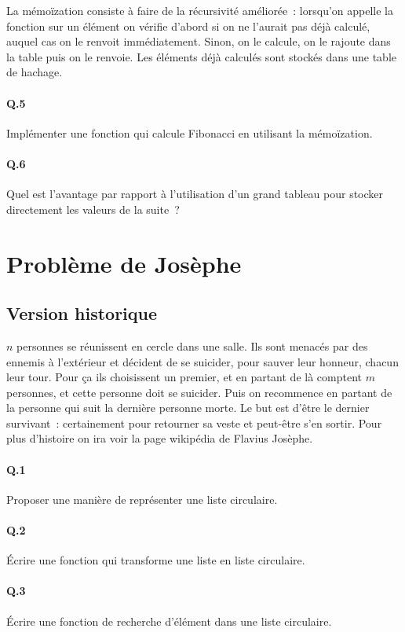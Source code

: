 \documentclass[10pt,a4paper]{article}
\begin{document}
La mémoïzation consiste à faire de la récursivité améliorée~: lorsqu'on appelle la fonction sur un élément on vérifie d'abord si on ne l'aurait pas déjà calculé, auquel cas on le renvoit immédiatement. Sinon, on le calcule, on le rajoute dans la table puis on le renvoie. Les éléments déjà calculés sont stockés dans une table de hachage.

\paragraph{Q.5} Implémenter une fonction qui calcule Fibonacci en utilisant la mémoïzation.

\paragraph{Q.6} Quel est l'avantage par rapport à l'utilisation d'un grand tableau pour stocker directement les valeurs de la suite~?

\section{Problème de Josèphe}

\subsection{Version historique}
$n$ personnes se réunissent en cercle dans une salle. Ils sont menacés par des ennemis à l'extérieur et décident de se suicider, pour sauver leur honneur, chacun leur tour. Pour ça ils choisissent un premier, et en partant de là comptent $m$ personnes, et cette personne doit se suicider. Puis on recommence en partant de la personne qui suit la dernière personne morte. Le but est d'être le dernier survivant~: certainement pour retourner sa veste et peut-être s'en sortir. Pour plus d'histoire on ira voir la page wikipédia de Flavius Josèphe.

\paragraph{Q.1} Proposer une manière de représenter une liste circulaire. 

\paragraph{Q.2} Écrire une fonction qui transforme une liste en liste circulaire.

\paragraph{Q.3} Écrire une fonction de recherche d'élément dans une liste circulaire.
\end{document}
